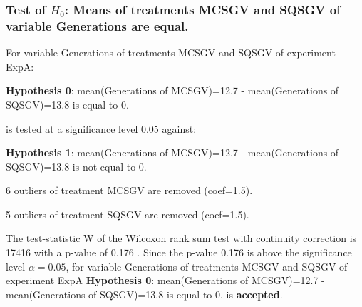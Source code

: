 \begin{frame}[t]
 \frametitle{Test of $H_{0}$: Means of treatments MCSGV and SQSGV of variable Generations are equal. }
 \scriptsize
 For variable Generations of treatments MCSGV and SQSGV of experiment ExpA:

\vspace{1mm}
{\bf Hypothesis 0}: mean(Generations of MCSGV)=12.7 - mean(Generations of SQSGV)=13.8 is equal to 0.


 \begin{center} is tested at a significance level 0.05 against: \end{center}

{\bf Hypothesis 1}: mean(Generations of MCSGV)=12.7 - mean(Generations of SQSGV)=13.8 is not equal to 0.
\vspace{1mm}
\vspace{1mm}

 6 outliers of treatment MCSGV are removed (coef=1.5).

 5 outliers of treatment SQSGV are removed (coef=1.5).
\vspace{1mm}
 
 The test-statistic W of the Wilcoxon rank sum test with continuity correction is 17416 with a p-value of 0.176 .
 Since the p-value 0.176 is above the significance level $\alpha= 0.05 $,
 for variable Generations of treatments MCSGV and SQSGV of experiment ExpA 
 {\bf Hypothesis 0}: mean(Generations of MCSGV)=12.7 - mean(Generations of SQSGV)=13.8 is equal to 0.
is {\bf accepted}.

 \end{frame}
